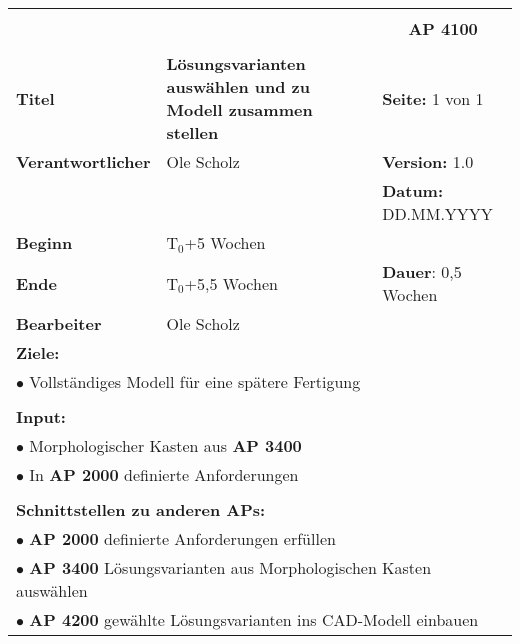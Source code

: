 \clearpage
\begin{table}[!h]
	\begin{center}
		\begin{tabular}{|p{35mm}||p{55mm}|p{50mm}||p{40mm}|}
			\hline
			\multicolumn{3}{|l||}{\textbf{}} & \multicolumn{1}{c|}{}\\
			\multicolumn{3}{|l||}{\textbf{}} & \multicolumn{1}{c|}{\textbf{AP 4100}}\\
			\multicolumn{3}{|l||}{\textbf{}} & \multicolumn{1}{c|}{}\\
			\hline\hline
			\textbf{Titel} & \multicolumn{2}{p{7cm}||}{\textbf{Lösungsvarianten auswählen und zu Modell zusammen stellen}} 
			& \textbf{Seite:} 1 von 1\\
			\hline
			\textbf{Verantwortlicher} & \multicolumn{2}{l||}{Ole Scholz} & \textbf{Version:} 1.0\\
			\hline
			\multicolumn{3}{|l||}{} & \textbf{Datum:} DD.MM.YYYY\\
			\hline\hline
			\textbf{Beginn} & \multicolumn{2}{l||}{T$_0$+5 Wochen} & \\
			\hline
			\textbf{Ende} & \multicolumn{2}{l||}{T$_0$+5,5 Wochen} & \textbf{Dauer}: 0,5 Wochen\\
			\hline\hline
			\textbf{Bearbeiter} & \multicolumn{3}{l|}{Ole Scholz}\\
			\hline\hline
			\multicolumn{4}{|p{150mm}|}{\textbf{Ziele:}}\\
			\multicolumn{4}{|p{150mm}|}{$\bullet$ Vollständiges Modell für eine spätere Fertigung}\\
			\multicolumn{4}{|p{150mm}|}{}\\
			\multicolumn{4}{|p{150mm}|}{\textbf{Input:}}\\
			\multicolumn{4}{|p{150mm}|}{$\bullet$ Morphologischer Kasten aus \textbf{AP 3400}}\\
			\multicolumn{4}{|p{150mm}|}{$\bullet$ In \textbf{AP 2000} definierte Anforderungen}\\
			\multicolumn{4}{|p{150mm}|}{}\\
			\multicolumn{4}{|p{150mm}|}{\textbf{Schnittstellen zu anderen APs:}}\\
			\multicolumn{4}{|p{150mm}|}{$\bullet$ \textbf{AP 2000} definierte Anforderungen erfüllen}\\
			\multicolumn{4}{|p{150mm}|}{$\bullet$ \textbf{AP 3400} Lösungsvarianten aus Morphologischen Kasten auswählen}\\
			\multicolumn{4}{|p{150mm}|}{$\bullet$ \textbf{AP 4200} gewählte Lösungsvarianten ins CAD-Modell einbauen}\\

\end{tabular}
\end{center}
\end{table}
